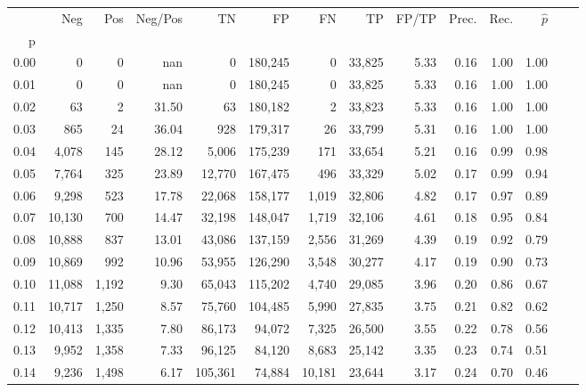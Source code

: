 \begin{tabular}{rrrrrrrrrrrrrr}
\toprule
{} &     Neg &    Pos & Neg/Pos &       TN &       FP &      FN &      TP & FP/TP & Prec. &  Rec. & $\hat{p}$ \\
p    &         &        &         &          &          &         &         &       &       &       &           \\
\midrule
0.00 &       0 &      0 &     nan &        0 &  180,245 &       0 &  33,825 &  5.33 &  0.16 &  1.00 &      1.00 \\
0.01 &       0 &      0 &     nan &        0 &  180,245 &       0 &  33,825 &  5.33 &  0.16 &  1.00 &      1.00 \\
0.02 &      63 &      2 &   31.50 &       63 &  180,182 &       2 &  33,823 &  5.33 &  0.16 &  1.00 &      1.00 \\
0.03 &     865 &     24 &   36.04 &      928 &  179,317 &      26 &  33,799 &  5.31 &  0.16 &  1.00 &      1.00 \\
0.04 &   4,078 &    145 &   28.12 &    5,006 &  175,239 &     171 &  33,654 &  5.21 &  0.16 &  0.99 &      0.98 \\
0.05 &   7,764 &    325 &   23.89 &   12,770 &  167,475 &     496 &  33,329 &  5.02 &  0.17 &  0.99 &      0.94 \\
0.06 &   9,298 &    523 &   17.78 &   22,068 &  158,177 &   1,019 &  32,806 &  4.82 &  0.17 &  0.97 &      0.89 \\
0.07 &  10,130 &    700 &   14.47 &   32,198 &  148,047 &   1,719 &  32,106 &  4.61 &  0.18 &  0.95 &      0.84 \\
0.08 &  10,888 &    837 &   13.01 &   43,086 &  137,159 &   2,556 &  31,269 &  4.39 &  0.19 &  0.92 &      0.79 \\
0.09 &  10,869 &    992 &   10.96 &   53,955 &  126,290 &   3,548 &  30,277 &  4.17 &  0.19 &  0.90 &      0.73 \\
0.10 &  11,088 &  1,192 &    9.30 &   65,043 &  115,202 &   4,740 &  29,085 &  3.96 &  0.20 &  0.86 &      0.67 \\
0.11 &  10,717 &  1,250 &    8.57 &   75,760 &  104,485 &   5,990 &  27,835 &  3.75 &  0.21 &  0.82 &      0.62 \\
0.12 &  10,413 &  1,335 &    7.80 &   86,173 &   94,072 &   7,325 &  26,500 &  3.55 &  0.22 &  0.78 &      0.56 \\
0.13 &   9,952 &  1,358 &    7.33 &   96,125 &   84,120 &   8,683 &  25,142 &  3.35 &  0.23 &  0.74 &      0.51 \\
0.14 &   9,236 &  1,498 &    6.17 &  105,361 &   74,884 &  10,181 &  23,644 &  3.17 &  0.24 &  0.70 &      0.46 \\

\end{tabular}
